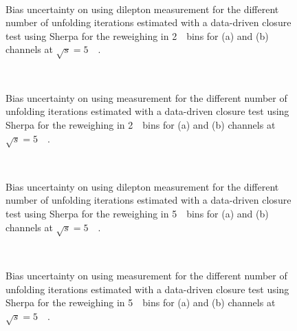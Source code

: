 \begin{figure}[h]
\centering
{}
\\
\caption{Bias uncertainty on \ptz using dilepton \pt measurement for the different number of unfolding iterations estimated with a data-driven closure test using Sherpa for the reweighing in 2~\GeV\ bins for \Zee (a) and \Zmm (b) channels at $\sqrt{s} = 5$~\TeV\ .}
\label{fig:sherpa_bias_Histmaker02_pt_5_2GeV}
\end{figure}
\begin{figure}[h]
\centering
{}
\\
\caption{Bias uncertainty on \ptz using \ut measurement for the different number of unfolding iterations estimated with a data-driven closure test using Sherpa for the reweighing in 2~\GeV\ bins for \Zee (a) and \Zmm (b) channels at $\sqrt{s} = 5$~\TeV\ .}
\label{fig:sherpa_bias_Histmaker02_ut_5_2GeV}
\end{figure}

\begin{figure}[h]
\centering
{}
\\
\caption{Bias uncertainty on \ptz using dilepton \pt measurement for the different number of unfolding iterations estimated with a data-driven closure test using Sherpa for the reweighing in 5~\GeV\ bins for \Zee (a) and \Zmm (b) channels at $\sqrt{s} = 5$~\TeV\ .}
\label{fig:sherpa_bias_Histmaker02_pt_5_5GeV}
\end{figure}
\begin{figure}[h]
\centering
{}
\\
\caption{Bias uncertainty on \ptz using \ut measurement for the different number of unfolding iterations estimated with a data-driven closure test using Sherpa for the reweighing in 5~\GeV\ bins for \Zee (a) and \Zmm (b) channels at $\sqrt{s} = 5$~\TeV\ .}
\label{fig:sherpa_bias_Histmaker02_ut_5_5GeV}
\end{figure}


